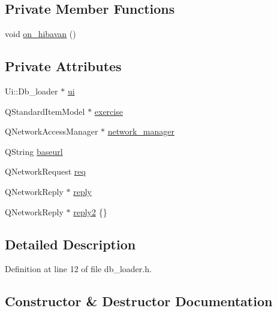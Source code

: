 \subsection*{Private Member Functions}
\begin{DoxyCompactItemize}
\item 
void \hyperlink{classDb__loader_aebf68b20ad5c3c7bac822b7c41f4e4ff}{on\+\_\+hibavan} ()
\end{DoxyCompactItemize}
\subsection*{Private Attributes}
\begin{DoxyCompactItemize}
\item 
Ui\+::\+Db\+\_\+loader $\ast$ \hyperlink{classDb__loader_a7bc8f5be142eb2ad90de8682268224ae}{ui}
\item 
Q\+Standard\+Item\+Model $\ast$ \hyperlink{classDb__loader_ae2bf960f9be242be7b72496bd28fb2b3}{exercise}
\item 
Q\+Network\+Access\+Manager $\ast$ \hyperlink{classDb__loader_af15e4654bb9e65eefdbcdfa9ac4fe816}{network\+\_\+manager}
\item 
Q\+String \hyperlink{classDb__loader_a2f830277361852656d3883ed25a9637d}{baseurl}
\item 
Q\+Network\+Request \hyperlink{classDb__loader_a3bf15a8ed1216c614b030610cebabaeb}{req}
\item 
Q\+Network\+Reply $\ast$ \hyperlink{classDb__loader_aa845f4b8ed46a42205b214db633ff141}{reply}
\item 
Q\+Network\+Reply $\ast$ \hyperlink{classDb__loader_abe12d8b3b8b23aeb4c70dc8cb103b33e}{reply2} \{\}
\end{DoxyCompactItemize}


\subsection{Detailed Description}


Definition at line 12 of file db\+\_\+loader.\+h.



\subsection{Constructor \& Destructor Documentation}
\mbox{\label{classDb__loader_a3a0062be83bea07369d7b6ab0fc77444}} 
